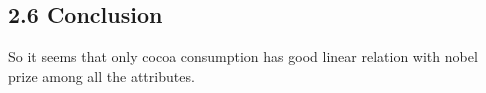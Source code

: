 \documentclass[11pt]{article}
\begin{document}
    
    \hypertarget{conclusion}{%
\subsection{2.6 Conclusion}\label{conclusion}}

    So it seems that only cocoa consumption has good linear relation with
nobel prize among all the attributes.


    
    
    
    
\end{document}
